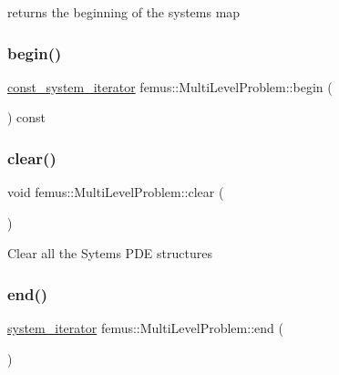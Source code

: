 returns the beginning of the systems map \mbox{\label{classfemus_1_1_multi_level_problem_a58fd8b551b33b7b69a89e0a5eefd3837}} 
\subsubsection{\texorpdfstring{begin()}{begin()}\hspace{0.1cm}{\footnotesize\ttfamily [2/2]}}
{\footnotesize\ttfamily \mbox{\hyperlink{classfemus_1_1_multi_level_problem_a8bf081f150a9e5685fc9281fc1dccd16}{const\+\_\+system\+\_\+iterator}} femus\+::\+Multi\+Level\+Problem\+::begin (\begin{DoxyParamCaption}{ }\end{DoxyParamCaption}) const\hspace{0.3cm}{\ttfamily [inline]}}

\mbox{\label{classfemus_1_1_multi_level_problem_a53549f240c0fd4b37e1a277f27ab7495}} 
\subsubsection{\texorpdfstring{clear()}{clear()}}
{\footnotesize\ttfamily void femus\+::\+Multi\+Level\+Problem\+::clear (\begin{DoxyParamCaption}{ }\end{DoxyParamCaption})}

Clear all the Sytems P\+DE structures \mbox{\label{classfemus_1_1_multi_level_problem_a380a034742259f88f121b965ffd1ee04}} 
\subsubsection{\texorpdfstring{end()}{end()}\hspace{0.1cm}{\footnotesize\ttfamily [1/2]}}
{\footnotesize\ttfamily \mbox{\hyperlink{classfemus_1_1_multi_level_problem_a0b963c16fa79db05093ceefa48cfe6f2}{system\+\_\+iterator}} femus\+::\+Multi\+Level\+Problem\+::end (\begin{DoxyParamCaption}{ }\end{DoxyParamCaption})\hspace{0.3cm}{\ttfamily [inline]}}

